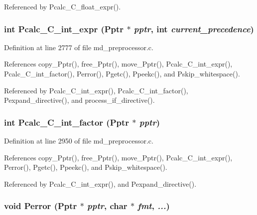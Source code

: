 Referenced by Pcalc\_\-C\_\-float\_\-expr().
\subsubsection{\setlength{\rightskip}{0pt plus 5cm}int Pcalc\_\-C\_\-int\_\-expr (\bf{Pptr} $\ast$ {\em pptr}, int {\em current\_\-precedence})}\label{md__preprocessor_8c_d0cd379c806bdf45c36a3f8fe9f28201}




Definition at line 2777 of file md\_\-preprocessor.c.

References copy\_\-Pptr(), free\_\-Pptr(), move\_\-Pptr(), Pcalc\_\-C\_\-int\_\-expr(), Pcalc\_\-C\_\-int\_\-factor(), Perror(), Pgetc(), Ppeekc(), and Pskip\_\-whitespace().

Referenced by Pcalc\_\-C\_\-int\_\-expr(), Pcalc\_\-C\_\-int\_\-factor(), Pexpand\_\-directive(), and process\_\-if\_\-directive().
\subsubsection{\setlength{\rightskip}{0pt plus 5cm}int Pcalc\_\-C\_\-int\_\-factor (\bf{Pptr} $\ast$ {\em pptr})}\label{md__preprocessor_8c_be976f6287689c26f1804b05a5604e1c}




Definition at line 2950 of file md\_\-preprocessor.c.

References copy\_\-Pptr(), free\_\-Pptr(), move\_\-Pptr(), Pcalc\_\-C\_\-int\_\-expr(), Perror(), Pgetc(), Ppeekc(), and Pskip\_\-whitespace().

Referenced by Pcalc\_\-C\_\-int\_\-expr(), and Pexpand\_\-directive().
\subsubsection{\setlength{\rightskip}{0pt plus 5cm}void Perror (\bf{Pptr} $\ast$ {\em pptr}, char $\ast$ {\em fmt},  {\em ...})}\label{md__preprocessor_8c_beffca6eda4a1c83ca9e7f1dd401fd99}




